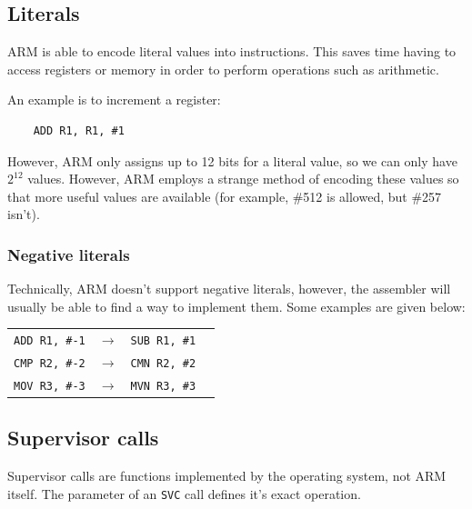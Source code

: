 \subsection{Literals}

ARM is able to encode literal values into instructions. This saves time having
to access registers or memory in order to perform operations such as arithmetic.

An example is to increment a register:

\begin{verbatim}
	ADD	R1, R1, #1
\end{verbatim}

However, ARM only assigns up to 12 bits for a literal value, so we can only have
$2^{12}$ values. However, ARM employs a strange method of encoding these values
so that more useful values are available (for example, \#512 is allowed, but
\#257 isn't).

\subsubsection{Negative literals}

Technically, ARM doesn't support negative literals, however, the assembler will
usually be able to find a way to implement them. Some examples are given below:

\begin{center}
    \begin{tabular}{l l l r}
        {\tt ADD R1, \#-1} & $\rightarrow$ & {\tt SUB R1, \#1}\\
        {\tt CMP R2, \#-2} & $\rightarrow$ & {\tt CMN R2, \#2}\\
        {\tt MOV R3, \#-3} & $\rightarrow$ & {\tt MVN R3, \#3}\\
    \end{tabular}
\end{center}


\subsection{Supervisor calls}

Supervisor calls are functions implemented by the operating system, not ARM
itself. The parameter of an {\tt SVC} call defines it's exact
operation.


